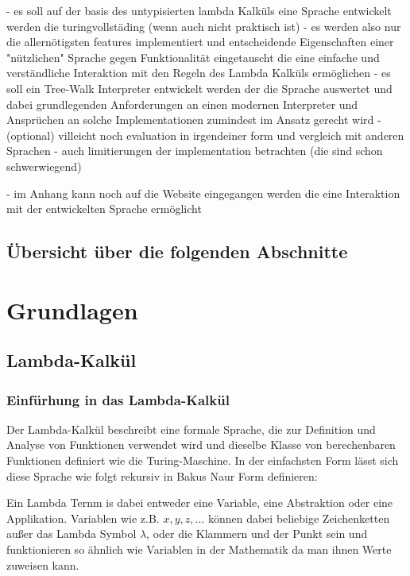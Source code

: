 \documentclass{article}
\begin{document}
- es soll auf der basis des untypisierten lambda Kalküls eine Sprache entwickelt werden die turingvollstäding (wenn auch nicht praktisch ist)
    - es werden also nur die allernötigsten features implementiert und entscheidende Eigenschaften einer "nützlichen" Sprache gegen Funktionalität eingetauscht die eine einfache und verständliche Interaktion mit den Regeln des Lambda Kalküls ermöglichen
- es soll ein Tree-Walk Interpreter entwickelt werden der die Sprache auswertet und dabei grundlegenden Anforderungen an einen modernen Interpreter und Ansprüchen an solche Implementationen zumindest im Ansatz gerecht wird 
- (optional) villeicht noch evaluation in irgendeiner form und vergleich mit anderen Sprachen 
- auch limitierungen der implementation betrachten (die sind schon schwerwiegend)

- im Anhang kann noch auf die Website eingegangen werden die eine Interaktion mit der entwickelten Sprache ermöglicht

\subsection{Übersicht über die folgenden Abschnitte}

\section{Grundlagen}

\subsection{Lambda-Kalkül}

\subsubsection{Einfürhung in das Lambda-Kalkül}

Der Lambda-Kalkül beschreibt eine formale Sprache, die zur Definition und Analyse von Funktionen verwendet wird und dieselbe Klasse von berechenbaren Funktionen definiert wie die Turing-Maschine.
In der einfachsten Form lässt sich diese Sprache wie folgt rekursiv in Bakus Naur Form definieren:


Ein Lambda Ternm is dabei entweder eine Variable, eine Abstraktion oder eine Applikation.
Variablen wie z.B. $x, y, z, ...$ können dabei beliebige Zeichenketten außer das Lambda Symbol $\lambda$, oder die Klammern und der Punkt sein und funktionieren so ähnlich wie Variablen in der Mathematik da man ihnen Werte zuweisen kann.
\end{document}

